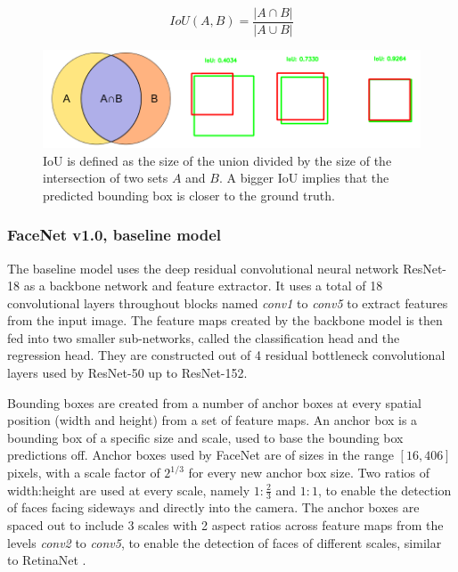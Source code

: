 \documentclass[a4paper, twoside]{article}
\begin{document}
\begin{equation}\label{eqiou}
IoU(A, B)=\frac{|A \cap B|}{|A \cup B|}
\end{equation}

\begin{figure}[h]
	\centering
  		\includegraphics[scale=0.5]{iou.png}
  	\caption{IoU \cite{iou} is defined as the size of the union divided by the size of the intersection of two sets $A$ and $B$. A bigger IoU implies that the predicted bounding box is closer to the ground truth. } \label{figiou}
\end{figure}

\subsubsection{FaceNet v1.0, baseline model}
The baseline model uses the deep residual convolutional neural network ResNet-18 \cite{resnet} as a backbone network and feature extractor. It uses a total of 18 convolutional layers throughout blocks named \textit{conv1} to \textit{conv5} to extract features from the input image. The feature maps created by the backbone model is then fed into two smaller sub-networks, called the classification head and the regression head. They are constructed out of 4 residual bottleneck convolutional layers used by ResNet-50 up to ResNet-152.

Bounding boxes are created from a number of anchor boxes at every spatial position (width and height) from a set of feature maps. An anchor box is a bounding box of a specific size and scale, used to base the bounding box predictions off. Anchor boxes used by FaceNet are of sizes in the range $[16, 406]$ pixels, with a scale factor of $2^{1/3}$ for every new anchor box size. Two ratios of width:height are used at every scale, namely $1:\frac{2}{3}$ and $1:1$, to enable the detection of faces facing sideways and directly into the camera. The anchor boxes are spaced out to include 3 scales with 2 aspect ratios across feature maps from the levels \textit{conv2} to \textit{conv5}, to enable the detection of faces of different scales, similar to RetinaNet \cite{retinanet}.
\end{document}
